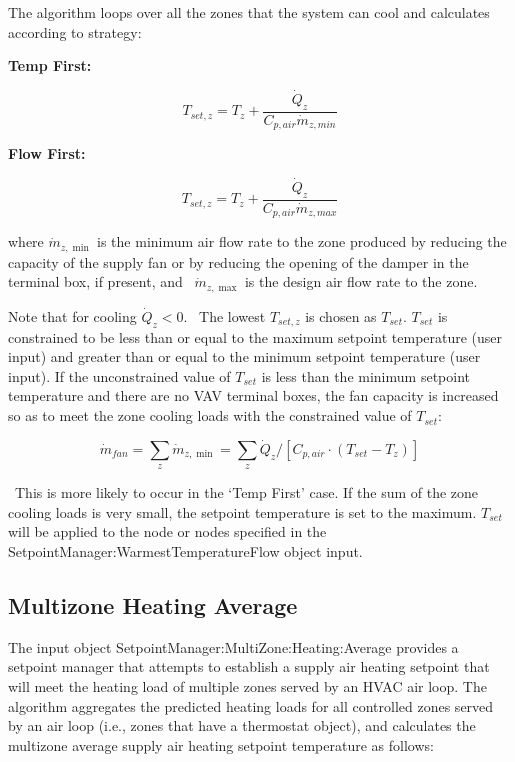 The algorithm loops over all the zones that the system can cool and calculates according to strategy:

\textbf{Temp First:}

\begin{equation}
  T_{set,z} = T_z + \frac{\dot{Q}_z}{C_{p,air} \dot{m}_{z,min}}
\end{equation}

\textbf{Flow First:}

\begin{equation}
  T_{set,z} = T_z + \frac{\dot{Q}_z}{C_{p,air} \dot{m}_{z,max}}
\end{equation}

where \({\dot m_{z,\min }}\) is the minimum air flow rate to the zone produced by reducing the capacity of the supply fan or by reducing the opening of the damper in the terminal box, if present, and~ \({\dot m_{z,\max }}\) is the design air flow rate to the zone.

Note that for cooling \({\dot Q_z} < 0\). ~The lowest \({T_{set,z}}\) is chosen as \({T_{set}}\). \({T_{set}}\) is constrained to be less than or equal to the maximum setpoint temperature (user input) and greater than or equal to the minimum setpoint temperature (user input). If the unconstrained value of \({T_{set}}\) is less than the minimum setpoint temperature and there are no VAV terminal boxes, the fan capacity is increased so as to meet the zone cooling loads with the constrained value of \({T_{set}}\):

\begin{equation}
{\dot m_{fan}} = \sum\limits_z {{{\dot m}_{z,\min }}}  = \sum\limits_z {{{\dot Q}_z}/[{C_{p,air}} \cdot ({T_{set}} - {T_z})]}
\end{equation}

~This is more likely to occur in the `Temp First' case. If the sum of the zone cooling loads is very small, the setpoint temperature is set to the maximum. \({T_{set}}\) will be applied to the node or nodes specified in the SetpointManager:WarmestTemperatureFlow object input.

\subsection{Multizone Heating Average}\label{multizone-heating-average}

The input object SetpointManager:MultiZone:Heating:Average provides a setpoint manager that attempts to establish a supply air heating setpoint that will meet the heating load of multiple zones served by an HVAC air loop. The algorithm aggregates the predicted heating loads for all controlled zones served by an air loop (i.e., zones that have a thermostat object), and calculates the multizone average supply air heating setpoint temperature as follows:

